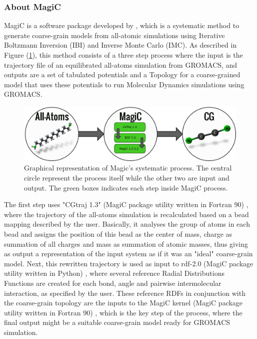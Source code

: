 \documentclass[10pt,a4paper,twoside]{article}
\begin{document}
\subsubsection{About MagiC}
\label{subsubsec:magic}
MagiC is a software package developed by , which is a systematic method to generate coarse-grain models from all-atomic simulations using Iterative Boltzmann Inversion (IBI) and Inverse Monte Carlo (IMC). As described in Figure (\ref{Fig:magic}), this method consists of a three step process where the input is the trajectory file of an equilibrated all-atoms simulation from GROMACS, and outputs are a set of tabulated potentials and a Topology for a coarse-grained model that uses these potentials to run Molecular Dynamics simulations using GROMACS. 
 \begin{figure}[ht]
  \begin{center}
	\includegraphics[width=1 \textwidth]{./images/magic}
	\caption{Graphical representation of Magic's systematic process. The central circle represent the process itself while the other two are input and output. The green boxes indicates each step inside MagiC process. }
	\label{Fig:magic}
	\end{center}
	\end{figure}

 The first step uses "CGtraj 1.3" (MagiC package utility written in Fortran 90) \cite{magicmanu}, where the trajectory of the all-atoms simulation is recalculated based on a bead mapping described by the user. Basically, it analyses the group of atoms in each bead and assigns the position of this bead as the center of mass, charge as summation of all charges and mass as summation of atomic masses, thus giving as output a representation of the input system as if it was an "ideal" coarse-grain model. Next, this rewritten trajectory is used as input to rdf-2.0  (MagiC package utility written in Python) \cite{magicmanu}, where several reference Radial Distributions Functions are created for each bond, angle and pairwise intermolecular interaction, as specified by the user. These reference RDFs in conjunction with the coarse-grain topology are the  inputs to the MagiC kernel (MagiC package utility written in Fortran 90) \cite{magicmanu}, which is the key step of the process, where the final output might be a suitable coarse-grain model ready for GROMACS simulation.
 
\end{document}
